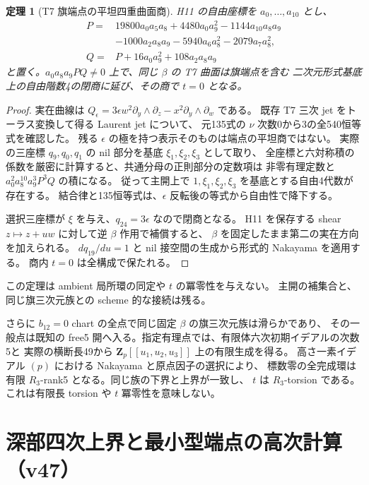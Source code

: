 \documentclass[11pt,a4paper]{ltjsarticle}
\newtheorem{theorem}{定理}[section]
\theoremstyle{remark}
\begin{document}
\begin{theorem}[T7 旗端点の平坦四重曲面商]
H11 の自由座標を $a_0,\ldots,a_{10}$ とし、
\[
\begin{split}
 P={}&19800a_0a_5a_8+4480a_0a_9^2-1144a_{10}a_8a_9\\
 &-1000a_2a_8a_9-5940a_6a_8^2-2079a_7a_8^2,\\
 Q={}&P+16a_0a_9^2+108a_2a_8a_9
\end{split}
\]
と置く。$a_0a_8a_9PQ\ne0$ 上で、同じ $\beta$ の T7 曲面は旗端点を含む
二次元形式基底上の自由階数4の閉商に延び、その商で $t=0$ となる。
\end{theorem}

\begin{proof}
実在曲線は $Q_\epsilon=3\epsilon w^2\partial_y\wedge\partial_z
-x^2\partial_y\wedge\partial_w$ である。
既存 T7 三次 jet をトーラス変換して得る Laurent jet について、
元135式の $\nu$ 次数0から3の全540恒等式を確認した。
残る $\epsilon$ の極を持つ表示そのものは端点の平坦商ではない。
実際の三座標 $q_9,q_0,q_1$ の nil 部分を基底 $\xi_1,\xi_2,\xi_3$ として取り、
全座標と六対称積の係数を厳密に計算すると、共通分母の正則部分の定数項は
非零有理定数と $a_0^2a_8^{10}a_9^3P^3Q$ の積になる。
従って主開上で $1,\xi_1,\xi_2,\xi_3$ を基底とする自由4代数が存在する。
結合律と135恒等式は、$\epsilon$ 反転後の等式から自由性で降下する。

選択三座標が $\xi$ を与え、$q_{24}=3\epsilon$ なので閉商となる。
H11 を保存する shear $z\mapsto z+uw$ に対して逆 $\beta$ 作用で補償すると、
$\beta$ を固定したまま第二の実在方向を加えられる。
$dq_{19}/du=1$ と nil 接空間の生成から形式的 Nakayama を適用する。
商内 $t=0$ は全構成で保たれる。\cite{flag-t7-flat4-v47}
\end{proof}

この定理は ambient 局所環の同定や $t$ の冪零性を与えない。
主開の補集合と、同じ旗三次元族との scheme 的な接続は残る。

さらに $b_{12}=0$ chart の全点で同じ固定 $\beta$ の旗三次元族は滑らかであり、
その一般点は既知の free5 開へ入る。指定有理点では、有限体六次初期イデアルの次数5と
実際の横断長49から $\mathbf Z_p[[u_1,u_2,u_3]]$ 上の有限生成を得る。
高さ一素イデアル $(p)$ における Nakayama と原点因子の選択により、
標数零の全完成環は有限 $R_3$-rank5 となる。同じ族の下界と上界が一致し、
$t$ は $R_3$-torsion である。これは有限長 torsion や $t$ 冪零性を意味しない。
\cite{flag-zero12-rank5-v47}

\section{深部四次上界と最小型端点の高次計算（v47）}
\end{document}
